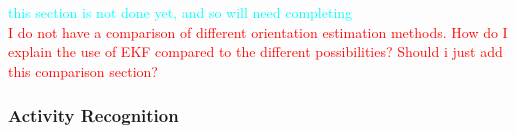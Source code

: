 \textcolor{cyan}{this section is not done yet, and so will need completing } \\ \newline
\textcolor{red}{I do not have a comparison of different orientation estimation methods. How do I explain the use of EKF compared to the different possibilities? Should i just add this comparison section?}

\subsubsection{Activity Recognition}





